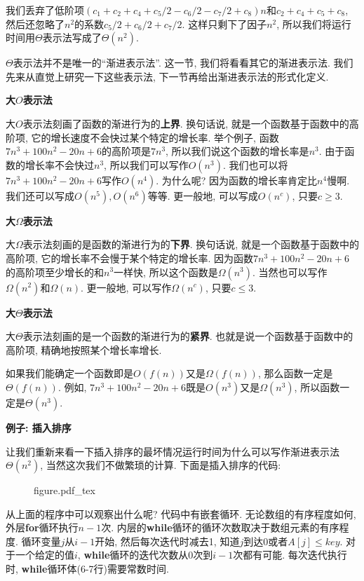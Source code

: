 \documentclass[oneside,10pt,fontset=none]{ctexbook}
\numberwithin{definition}{chapter}
\numberwithin{theorem}{chapter}
\numberwithin{lemma}{chapter}
\begin{document}
我们丢弃了低阶项$(c_1+c_2+c_4+c_5/2-c_6/2-c_7/2+c_8)n$和$c_2+c_4+c_5+c_8$, 然后还忽略了$n^2$的系数$c_5/2+c_6/2+c_7/2$. 这样只剩下了因子$n^2$, 所以我们将运行时间用$\Theta$表示法写成了$\Theta(n^2)$. 


$\Theta$表示法并不是唯一的``渐进表示法''. 这一节, 我们将看看其它的渐进表示法. 我们先来从直觉上研究一下这些表示法, 下一节再给出渐进表示法的形式化定义.

\textbf{大$O$表示法}

大$O$表示法刻画了函数的渐进行为的\textbf{上界}. 换句话说, 就是一个函数基于函数中的高阶项, 它的增长速度不会快过某个特定的增长率. 举个例子, 函数$7n^3+100n^2-20n+6$的高阶项是$7n^3$, 所以我们说这个函数的增长率是$n^3$. 由于函数的增长率不会快过$n^3$, 所以我们可以写作$O(n^3)$. 我们也可以将$7n^3+100n^2-20n+6$写作$O(n^4)$. 为什么呢? 因为函数的增长率肯定比$n^4$慢啊. 我们还可以写成$O(n^5),O(n^6)$等等. 更一般地, 可以写成$O(n^c)$, 只要$c\geq 3$.

\textbf{大$\Omega$表示法}

大$\Omega$表示法刻画的是函数的渐进行为的\textbf{下界}. 换句话说, 就是一个函数基于函数中的高阶项, 它的增长率不会慢于某个特定的增长率. 因为函数$7n^3+100n^2-20n+6$的高阶项至少增长的和$n^3$一样快, 所以这个函数是$\Omega(n^3)$. 当然也可以写作$\Omega(n^2)$和$\Omega(n)$. 更一般地, 可以写作$\Omega(n^c)$, 只要$c\leq 3$.

\textbf{大$\Theta$表示法}

大$\Theta$表示法刻画的是一个函数的渐进行为的\textbf{紧界}. 也就是说一个函数基于函数中的高阶项, 精确地按照某个增长率增长.

如果我们能确定一个函数即是$O(f(n))$又是$\Omega(f(n))$, 那么函数一定是$\Theta(f(n))$. 例如, $7n^3+100n^2-20n+6$既是$O(n^3)$又是$\Omega(n^3)$, 所以函数一定是$\Theta(n^3)$.

\textbf{例子: 插入排序}

让我们重新来看一下插入排序的最坏情况运行时间为什么可以写作渐进表示法$\Theta(n^2)$, 当然这次我们不做繁琐的计算. 下面是插入排序的代码:

\begin{figure}[htbp]
    \centering
    \def\svgwidth{\columnwidth}
    {figure.pdf_tex}
\end{figure}

从上面的程序中可以观察出什么呢? 代码中有嵌套循环. 无论数组的有序程度如何, 外层\textbf{for}循环执行$n-1$次. 内层的\textbf{while}循环的循环次数取决于数组元素的有序程度. 循环变量$j$从$i-1$开始, 然后每次迭代时减去1, 知道$j$到达0或者$A[j]\leq key$. 对于一个给定的值$i$, \textbf{while}循环的迭代次数从0次到$i-1$次都有可能. 每次迭代执行时, \textbf{while}循环体(6-7行)需要常数时间.
\end{document}
